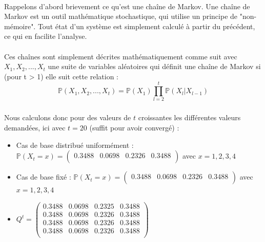 \paragraph{}
Rappelons d'abord brievement ce qu'est une chaîne de Markov. Une chaîne de Markov est un outil mathématique stochastique, qui utilise un principe de "non-mémoire". 
Tout état d'un système est simplement calculé à partir du précédent, ce qui en facilite l'analyse.
\\\\
Ces chaînes sont simplement décrites mathématiquement comme suit avec $X_1, X_2,..., X_t$ une suite de variables aléatoires qui définit une chaîne de Markov
si (pour t > 1) elle suit cette relation :
\begin{equation*}
  \mathbb{P}(X_1, X_2, ..., X_t) = \mathbb{P}(X_1)\prod_{l = 2}^{t}\mathbb{P}(X_l | X_{l-1}) 
\end{equation*}

\subsubsection{}

Nous calculons donc pour des valeurs de $t$ croissantes les différentes valeurs demandées, ici avec $t = 20$ (suffit pour avoir convergé) :
\begin{itemize}
  \item Cas de base distribué uniformément : $\mathbb{P}(X_t = x) = 
  \begin{pmatrix}
    0.3488 & 0.0698 & 0.2326 & 0.3488\\
  \end{pmatrix}$ avec $x = 1, 2, 3, 4$
  \item Cas de base fixé : $\mathbb{P}(X_t = x) = 
  \begin{pmatrix}
    0.3488 & 0.0698 & 0.2326 & 0.3488\\
  \end{pmatrix}$ avec $x = 1, 2, 3, 4$
  \item $Q^t = 
  \begin{pmatrix}
  0.3488 & 0.0698 & 0.2325 & 0.3488\\
  0.3488 & 0.0698 & 0.2326 & 0.3488\\
  0.3488 & 0.0698 & 0.2326 & 0.3488\\
  0.3488 & 0.0698 & 0.2326 & 0.3488\\
  \end{pmatrix}$ 
\end{itemize}

